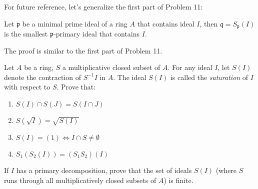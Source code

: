 \documentclass{solution}
\begin{document}
For future reference, let's generalize the first part of Problem 11:

\begin{proposition}
    Let $\mathfrak{p}$ be a minimal prime ideal of a ring $A$ that contains ideal $I$, then $\mathfrak{q} = S_{\mathfrak{p}}(I)$ is the smallest $\mathfrak{p}$-primary ideal that contains $I$.
\end{proposition}

The proof is similar to the first part of Problem 11.

\begin{problem}
    Let $A$ be a ring, $S$ a multiplicative closed subset of $A$. For any ideal $I$, let $S(I)$ denote the contraction of $S ^{-1}I$ in $A$. The ideal $S(I)$ is called the \textit{saturation} of $I$ with respect to $S$. Prove that:
    \begin{enumerate}
        \item $S(I) \cap S(J) = S(I \cap J)$
        \item $S(\sqrt{I}) = \sqrt{S(I)}$
        \item $S(I) = (1) \Leftrightarrow I \cap S \ne \emptyset$
        \item $S_1(S_2(I)) = (S_1S_2)(I)$
    \end{enumerate}
    If $I$ has a primary decomposition, prove that the set of ideals $S(I)$ (where $S$ runs through all multiplicatively closed subsets of $A$) is finite.
\end{problem}
\end{document}
